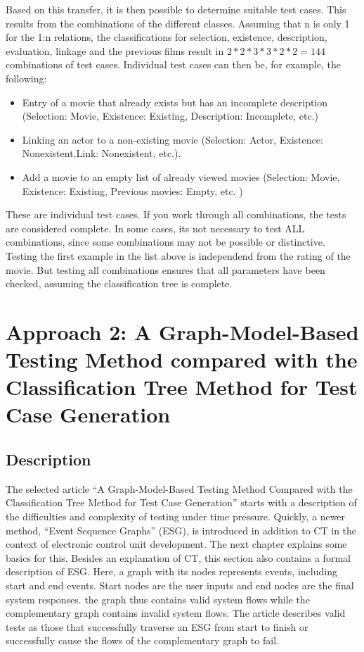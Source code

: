 Based on this transfer, it is then possible to determine suitable test cases. This results from the combinations of the different classes. Assuming that n is only 1 for the 1:n relations, the classifications for selection, existence, description, evaluation, linkage and the previous films result in $2*2*3*3*2*2 = 144$ combinations of test cases. Individual test cases can then be, for example, the following:

\begin{itemize}
\item Entry of a movie that already exists but has an incomplete description (Selection: Movie, Existence: Existing, Description: Incomplete, etc.)
\item Linking an actor to a non-existing movie (Selection: Actor, Existence: Nonexistent,Link: Nonexistent, etc.).
\item Add a movie to an empty list of already viewed movies (Selection: Movie, Existence: Existing, Previous movies: Empty, etc. )
\end{itemize}

These are individual test cases. If you work through all combinations, the tests are considered complete. In some cases, its not necessary to test ALL combinations, since some combinations may not be possible or distinctive. Testing the first example in the list above is independend from the rating of the movie. But testing all combinations ensures that all parameters have been checked, assuming the classification tree is complete.

\section{Approach 2: A Graph-Model-Based Testing Method compared with the Classification Tree Method for Test Case Generation}
\label{Kap:Approach2}

\subsection{Description}

The selected article \enquote{A Graph-Model-Based Testing Method Compared with the Classification Tree Method for Test Case Generation} starts with a description of the difficulties and complexity of testing under time pressure. Quickly, a newer method, \enquote{Event Sequence Graphs} (ESG), is introduced in addition to CT in the context of electronic control unit development. The next chapter explains some basics for this. Besides an explanation of CT, this section also contains a formal description of ESG. Here, a graph with its nodes represents events, including start and end events. Start nodes are the user inputs and end nodes are the final system responses. the graph thus contains valid system flows while the complementary graph contains invalid system flows. The article describes valid tests as those that successfully traverse an ESG from start to finish or successfully cause the flows of the complementary graph to fail.

